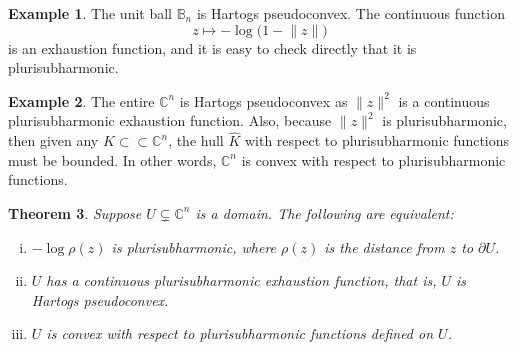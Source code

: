 \documentclass[12pt,openany]{book}
\newcommand{\snorm}[1]{\lVert {#1} \rVert}
\newcommand{\C}{{\mathbb{C}}}
\newcommand{\bB}{{\mathbb{B}}}
\theoremstyle{plain}
\newtheorem{thm}{Theorem}[section]
\theoremstyle{remark}
\theoremstyle{definition}
\theoremstyle{exercise}
\theoremstyle{example}
\newtheorem{example}[thm]{Example}
\begin{document}
\begin{example}
The unit ball $\bB_n$ is Hartogs pseudoconvex.  The continuous
function
\begin{equation*}
z \mapsto - \log \bigl( 1-\snorm{z} \bigr) 
\end{equation*}
is an exhaustion function, and it is easy to
check directly that it is plurisubharmonic.
\end{example}

\begin{example}
The entire $\C^n$ is Hartogs pseudoconvex as $\snorm{z}^2$ is
a continuous plurisubharmonic exhaustion function.
Also, because $\snorm{z}^2$ is plurisubharmonic, then given any $K \subset \subset
\C^n$, the hull $\widehat{K}$ with respect to plurisubharmonic functions must 
be bounded.  In other words, $\C^n$ is convex with respect to
plurisubharmonic functions.
\end{example}

\begin{samepage}
\begin{thm}
Suppose $U \subsetneq \C^n$ is a domain.  The following are equivalent:
\begin{enumerate}[(i)]
\item \label{thm:pscvx:itemi}
$-\log \rho(z)$ is plurisubharmonic, where $\rho(z)$ is the distance from $z$
to $\partial U$.
\item \label{thm:pscvx:itemii}
$U$ has a continuous plurisubharmonic exhaustion function,
that is, $U$ is Hartogs pseudoconvex.
\item \label{thm:pscvx:itemiii}
$U$ is convex with respect to plurisubharmonic functions defined on $U$.
\end{enumerate}
\end{thm}
\end{samepage}
\end{document}
